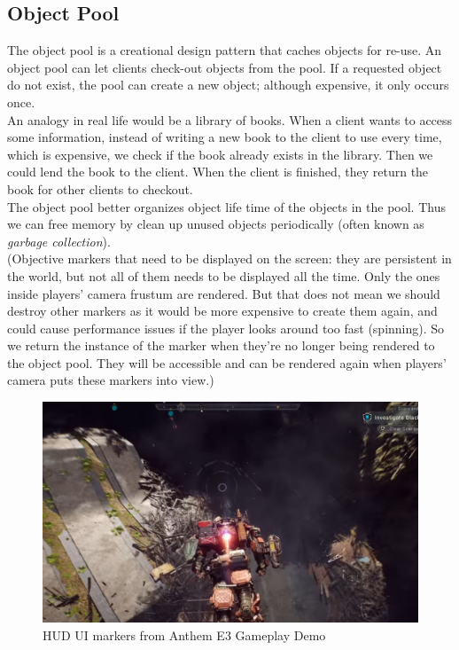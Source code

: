 \iftwocolumns
\begin{multicols}{2}
\fi

\subsection{Object Pool}
The object pool is a creational design pattern that caches objects for re-use. An object pool can let clients check-out objects from the pool. If a requested object do not exist, the pool can create a new object; although expensive, it only occurs once.\bs
\\
An analogy in real life would be a library of books. When a client wants to access some information, instead of writing a new book to the client to use every time, which is expensive, we check if the book already exists in the library. Then we could lend the book to the client. When the client is finished, they return the book for other clients to checkout.\bs
\\
The object pool better organizes object life time of the objects in the pool. Thus we can free memory by clean up unused objects periodically (often known as \textit{garbage collection}).\bs
\\


(Objective markers that need to be displayed on the screen: they are persistent in the world, but not all of them needs to be displayed all the time. Only the ones inside players' camera frustum are rendered. But that does not mean we should destroy other markers as it would be more expensive to create them again, and could cause performance issues if the player looks around too fast (spinning). So we return the instance of the marker when they're no longer being rendered to the object pool. They will be accessible and can be rendered again when players' camera puts these markers into view.)

\begin{figure}[H]
	\centering
	\includegraphics[width=\fullwidth]{assets/anthem-markers}
	\caption{HUD UI markers from Anthem E3 Gameplay Demo\cite{anthem-e3}}
	\label{fig:anthem-hud-markers}
\end{figure}


\end{multicols}
